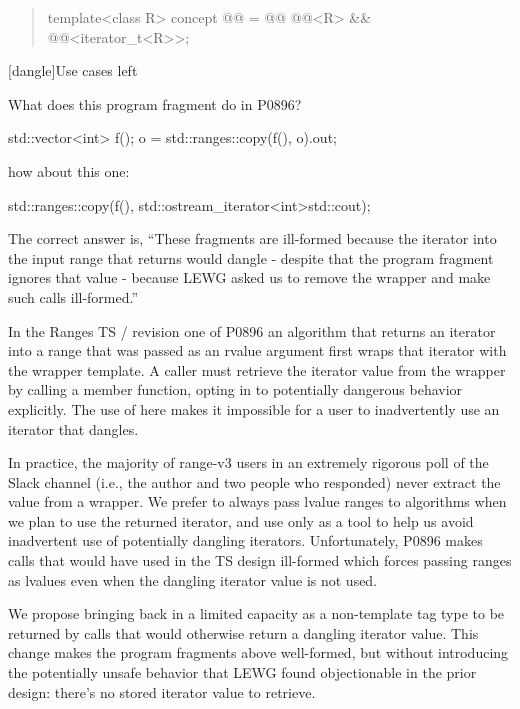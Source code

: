 \begin{quote}
\begin{itemdecl}
template<class R>
concept @@ = @@
  @@<R> &&
  @@<iterator_t<R>>;
\end{itemdecl}
\end{quote}


[dangle]{Use cases left }

What does this program fragment do in P0896?
\begin{codeblock}
std::vector<int> f();
o = std::ranges::copy(f(), o).out;
\end{codeblock}
how about this one:
\begin{codeblock}
std::ranges::copy(f(), std::ostream_iterator<int>{std::cout});
\end{codeblock}
The correct answer is, ``These fragments are ill-formed because the iterator into
the input range that  returns would dangle - despite that
the program fragment ignores that value - because LEWG asked us to remove the
 wrapper and make such calls ill-formed.''

In the Ranges TS / revision one of P0896 an algorithm that returns an iterator
into a range that was passed as an rvalue argument first wraps that iterator
with the  wrapper template. A caller must retrieve the iterator
value from the wrapper by calling a member function, opting in to potentially
dangerous behavior explicitly. The use of  here makes it
impossible for a user to inadvertently use an iterator that dangles.

In practice, the majority of range-v3 users in an extremely rigorous poll of the
 Slack channel (i.e., the author and two people who responded)
never extract the value from a  wrapper. We prefer to always
pass lvalue ranges to algorithms when we plan to use the returned iterator, and
use  only as a tool to help us avoid inadvertent use of
potentially dangling iterators. Unfortunately, P0896 makes calls that would have
used  in the TS design ill-formed which forces passing ranges
as lvalues even when the dangling iterator value is not used.

We propose bringing back  in a limited capacity as a
non-template tag type to be returned by calls that would otherwise return a
dangling iterator value. This change makes the program fragments above
well-formed, but without introducing the potentially unsafe behavior that LEWG
found objectionable in the prior  design: there's no stored
iterator value to retrieve.

